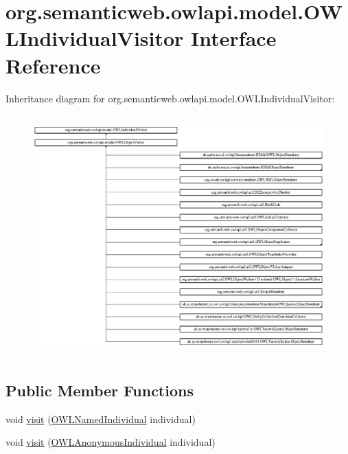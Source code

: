 \hypertarget{interfaceorg_1_1semanticweb_1_1owlapi_1_1model_1_1_o_w_l_individual_visitor}{\section{org.\-semanticweb.\-owlapi.\-model.\-O\-W\-L\-Individual\-Visitor Interface Reference}
\label{interfaceorg_1_1semanticweb_1_1owlapi_1_1model_1_1_o_w_l_individual_visitor}
}
Inheritance diagram for org.\-semanticweb.\-owlapi.\-model.\-O\-W\-L\-Individual\-Visitor\-:\begin{figure}[H]
\begin{center}
\leavevmode
\includegraphics[height=9.333334cm]{interfaceorg_1_1semanticweb_1_1owlapi_1_1model_1_1_o_w_l_individual_visitor}
\end{center}
\end{figure}
\subsection*{Public Member Functions}
\begin{DoxyCompactItemize}
\item 
void \hyperlink{interfaceorg_1_1semanticweb_1_1owlapi_1_1model_1_1_o_w_l_individual_visitor_ad067abde8db0fdb2c92faec9214d8ff5}{visit} (\hyperlink{interfaceorg_1_1semanticweb_1_1owlapi_1_1model_1_1_o_w_l_named_individual}{O\-W\-L\-Named\-Individual} individual)
\item 
void \hyperlink{interfaceorg_1_1semanticweb_1_1owlapi_1_1model_1_1_o_w_l_individual_visitor_ac8eb6b075248f9039b7e5235eebbcf63}{visit} (\hyperlink{interfaceorg_1_1semanticweb_1_1owlapi_1_1model_1_1_o_w_l_anonymous_individual}{O\-W\-L\-Anonymous\-Individual} individual)
\end{DoxyCompactItemize}


